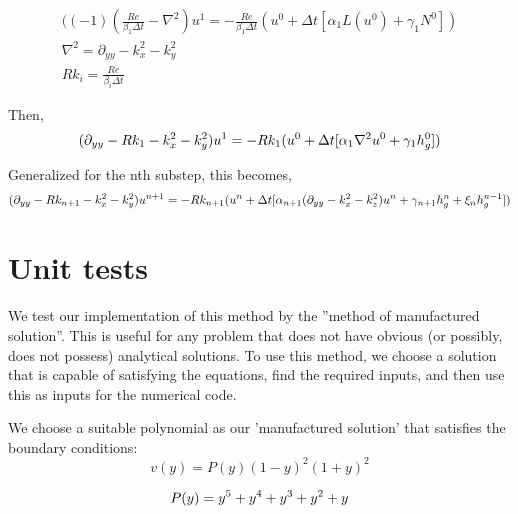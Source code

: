 \documentclass{article}
\begin{document}
\begin{eqnarray} 
    ((-1)(\frac{Re}{\beta_1 \Delta t}  - \nabla^2) u^1= - \frac{Re}{\beta_1 \Delta t} (u^0 + \Delta t[ \alpha_1 L(u^0) + \gamma_1 N^0]) \\
    \nabla^2 = \partial_{yy} - k_x^2 - k_y^2 \\
    Rk_i = \frac{Re}{\beta_i \Delta t}
\end{eqnarray}

Then,
\begin{equation}   
  (\partial_{yy} - Rk_1 - k_x^2 - k_y^2) u^1= - Rk_1 (u^0 + \Delta t [ \alpha_1 \nabla^2 u^0 + \gamma_1 h_g^0]) \\
\end{equation}

Generalized for the nth substep, this becomes,
\begin{equation} 
  (\partial_{yy} - Rk_{n+1} - k_x^2 - k_y^2) u^{n+1} = - Rk_{n+1} (u^n + \Delta t[ \alpha_{n+1} (\partial_{yy} - k_x^2 - k_z^2) u^{n} + \gamma_{n+1} h_g^{n} + \xi_{n} h_g^{n-1}]) \\
\end{equation}

\newpage
\section{Unit tests}

We test our implementation of this method by the ''method of manufactured solution''. This is useful for any problem that does 
not have obvious (or possibly, does not possess) analytical solutions. To use this method, we choose a solution that is 
capable of satisfying the equations, find the required inputs, and then use this as inputs for the numerical code. 

We choose a suitable polynomial as our 'manufactured solution' that satisfies the boundary conditions:
\begin{equation} 
  v(y) = P(y)(1-y)^2(1+y)^2
\end{equation}

\begin{equation} 
  P(y) = y^5 + y^4 + y^3 + y^2 + y \\
\end{equation}

\end{document}
